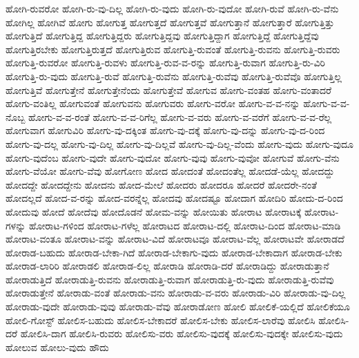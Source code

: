 {ಹೋಗಿ-ರುವರೋ
ಹೋಗಿ-ರು-ವು-ದಿಲ್ಲ
ಹೋಗಿ-ರು-ವುದು
ಹೋಗಿ-ರು-ವುದೋ
ಹೋಗಿ-ರುವೆ
ಹೋಗಿ-ರು-ವೆನು
ಹೋಗಿಲ್ಲ
ಹೋಗಿವೆ
ಹೋಗು
ಹೋಗುತ್ತ
ಹೋಗುತ್ತದೆ
ಹೋಗುತ್ತವೆ
ಹೋಗುತ್ತಾನೆ
ಹೋಗುತ್ತಾರೆ
ಹೋಗುತ್ತಿತ್ತು
ಹೋಗುತ್ತಿದೆ
ಹೋಗುತ್ತಿದ್ದ
ಹೋಗುತ್ತಿದ್ದರು
ಹೋಗುತ್ತಿದ್ದವು
ಹೋಗುತ್ತಿದ್ದಾಗ
ಹೋಗುತ್ತಿದ್ದೆ
ಹೋಗುತ್ತಿದ್ದೆವು
ಹೋಗುತ್ತಿರಬೇಕು
ಹೋಗುತ್ತಿರುತ್ತದೆ
ಹೋಗುತ್ತಿರುವ
ಹೋಗುತ್ತಿ-ರುವಂತೆ
ಹೋಗುತ್ತಿ-ರುವನು
ಹೋಗುತ್ತಿ-ರುವರು
ಹೋಗುತ್ತಿ-ರುವರೋ
ಹೋಗುತ್ತಿ-ರುವಳು
ಹೋಗುತ್ತಿ-ರುವ-ವ-ರನ್ನು
ಹೋಗುತ್ತಿ-ರುವಾಗ
ಹೋಗುತ್ತಿ-ರು-ವಿರಿ
ಹೋಗುತ್ತಿ-ರು-ವುದು
ಹೋಗುತ್ತಿ-ರುವೆ
ಹೋಗುತ್ತಿ-ರುವೆನು
ಹೋಗುತ್ತಿ-ರುವೆವು
ಹೋಗುತ್ತಿ-ರುವೆವೊ
ಹೋಗುತ್ತಿಲ್ಲ
ಹೋಗುತ್ತಿವೆ
ಹೋಗುತ್ತೇನೆ
ಹೋಗುತ್ತೇನೆಂದು
ಹೋಗುತ್ತೇವೆ
ಹೋಗುವ
ಹೋಗು-ವಂತಹ
ಹೋಗು-ವಂತಾದರೆ
ಹೋಗು-ವಂತಿಲ್ಲ
ಹೋಗುವಂತೆ
ಹೋಗುವನು
ಹೋಗುವರು
ಹೋಗು-ವರೋ
ಹೋಗು-ವ-ವ-ನನ್ನು
ಹೋಗು-ವ-ವ-ನೊಬ್ಬ
ಹೋಗು-ವ-ವ-ರಂತೆ
ಹೋಗು-ವ-ವ-ರಿಗೆಲ್ಲ
ಹೋಗು-ವ-ವರು
ಹೋಗು-ವ-ವರೆಗೆ
ಹೋಗು-ವ-ವ-ರೆಲ್ಲ
ಹೋಗುವಾಗ
ಹೋಗುವಿರಿ
ಹೋಗು-ವು-ದಕ್ಕಿಂತ
ಹೋಗು-ವು-ದಕ್ಕೆ
ಹೋಗು-ವು-ದನ್ನು
ಹೋಗು-ವು-ದ-ರಿಂದ
ಹೋಗು-ವು-ದಲ್ಲ
ಹೋಗು-ವು-ದಿಲ್ಲ
ಹೋಗು-ವು-ದಿಲ್ಲವೆ
ಹೋಗು-ವು-ದಿಲ್ಲ-ವೆಂದು
ಹೋಗು-ವುದು
ಹೋಗು-ವುದೂ
ಹೋಗು-ವುದೆಂಬ
ಹೋಗು-ವುದೇ
ಹೋಗು-ವುದೋ
ಹೋಗು-ವುವು
ಹೋಗು-ವುವೋ
ಹೋಗುವೆ
ಹೋಗು-ವೆನು
ಹೋಗು-ವೆಯೋ
ಹೋಗು-ವೆವು
ಹೋಗೋಣ
ಹೋದ
ಹೋದಂತೆ
ಹೋದಂತೆಲ್ಲ
ಹೋದಡೆ-ಯೆಲ್ಲ
ಹೋದದ್ದು
ಹೋದದ್ದೇ
ಹೋದದ್ದೇನು
ಹೋದನು
ಹೋದ-ಮೇಲೆ
ಹೋದರು
ಹೋದರೂ
ಹೋದರೆ
ಹೋದರೇ-ನಂತೆ
ಹೋದಲ್ಲದೆ
ಹೋದ-ವ-ರನ್ನು
ಹೋದ-ವರನ್ನೆಲ್ಲ
ಹೋದವು
ಹೋದಷ್ಟೂ
ಹೋದಾಗ
ಹೋದಿರಿ
ಹೋದು-ದ-ರಿಂದ
ಹೋದುವು
ಹೋದೆ
ಹೋದೆವು
ಹೋದೊಡನೆ
ಹೋಮ-ವನ್ನು
ಹೋಯಿತು
ಹೋರಾಟ
ಹೋರಾಟಕ್ಕೆ
ಹೋರಾಟ-ಗಳನ್ನು
ಹೋರಾಟ-ಗಳಿಂದ
ಹೋರಾಟ-ಗಳೆಲ್ಲ
ಹೋರಾಟದ
ಹೋರಾಟ-ದಲ್ಲಿ
ಹೋರಾಟ-ದಿಂದ
ಹೋರಾಟ-ಮಾಡಿ
ಹೋರಾಟ-ವಂತೂ
ಹೋರಾಟ-ವನ್ನು
ಹೋರಾಟ-ವಿದೆ
ಹೋರಾಟವೂ
ಹೋರಾಟ-ವೆಲ್ಲ
ಹೋರಾಟವೇ
ಹೋರಾಡದೆ
ಹೋರಾಡ-ಬಹುದು
ಹೋರಾಡ-ಬೇಕಾ-ಗಿದೆ
ಹೋರಾಡ-ಬೇಕಾಗು-ವುದು
ಹೋರಾಡ-ಬೇಕಾದಾಗ
ಹೋರಾಡ-ಬೇಕು
ಹೋರಾಡ-ಲಾರಿರಿ
ಹೋರಾಡಲಿ
ಹೋರಾಡ-ಲಿಲ್ಲ
ಹೋರಾಡಿ
ಹೋರಾಡಿ-ದರೆ
ಹೋರಾಡಿದ್ದು
ಹೋರಾಡುತ್ತಾನೆ
ಹೋರಾಡುತ್ತಿದೆ
ಹೋರಾಡುತ್ತಿ-ರುವನು
ಹೋರಾಡುತ್ತಿ-ರುವಾಗ
ಹೋರಾಡುತ್ತಿ-ರು-ವುದು
ಹೋರಾಡುತ್ತಿ-ರುವೆವು
ಹೋರಾಡುತ್ತೇನೆ
ಹೋರಾಡು-ವಂತೆ
ಹೋರಾಡು-ವನು
ಹೋರಾಡು-ವ-ವರು
ಹೋರಾಡು-ವಿರಿ
ಹೋರಾಡು-ವು-ದಿಲ್ಲ
ಹೋರಾಡು-ವುದೇ
ಹೋರಾಡು-ವುವು
ಹೋರಾಡು-ವೆವು
ಹೋರಾಡೋಣ
ಹೋಲಿ
ಹೋಲಿಕೆ-ಯಲ್ಲಿದೆ
ಹೋಲಿಕೆಯೂ
ಹೋಲಿ-ಗೋಸ್ಟ್
ಹೋಲಿಸ-ಬಹುದು
ಹೋಲಿಸ-ಬೇಕಾದರೆ
ಹೋಲಿಸ-ಬೇಕು
ಹೋಲಿಸ-ಲಾರೆವು
ಹೋಲಿಸಿ
ಹೋಲಿಸಿ-ದರೆ
ಹೋಲಿಸಿ-ದಾಗ
ಹೋಲಿಸಿ-ರುವರು
ಹೋಲಿಸು-ವರು
ಹೋಲಿಸು-ವುದಕ್ಕೆ
ಹೋಲಿಸು-ವುದಕ್ಕೇ
ಹೋಲಿಸು-ವುದು
ಹೋಲುವ
ಹೋಲು-ವುದು
ಹೌದು
}
